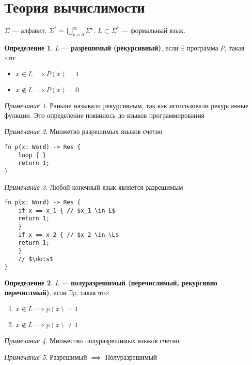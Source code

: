 \documentclass[oneside]{book}
\theoremstyle{plain}
\theoremstyle{remark}
\newtheorem*{remark}{Примечание}
\theoremstyle{definition}
\newtheorem*{definition}{Определение}
\begin{document}
\section{Теория вычислимости}
\label{sec:org5715bcb}
\(\Sigma\) --- алфавит, \(\Sigma^* = \bigcup_{k = 0}^\infty \Sigma^k\). \(L \subset \Sigma^*\) --- формальный язык.
\begin{definition}
\(L\) --- \textbf{разрешимый (рекурсивный)}, если \(\exists\) программа \(P\), такая что:
\begin{itemize}
\item \(x \in L \implies P(x) = 1\)
\item \(x \not\in L \implies P(x) = 0\)
\end{itemize}
\end{definition}
\begin{remark}
Раньше называли рекурсивным, так как использовали рекурсивные функции. Это определение появилось до языков программирования
\end{remark}
\begin{remark}
Множетво разрешимых языков счетно
\begin{verbatim}
fn p(x: Word) -> Res {
    loop { }
    return 1;
}
\end{verbatim}
\end{remark}
\begin{remark}
Любой конечный язык является разрешимым
\begin{verbatim}
fn p(x: Word) -> Res {
    if x == x_1 { // $x_1 \in L$
	return 1; 
    }
    if x == x_2 { // $x_2 \in \L$
	return 1;
    }
    // $\dots$
}
\end{verbatim}
\end{remark}
\begin{definition}
\(L\) --- \textbf{полуразрешимый (перечислимый, рекурсивно перечислмый)}, если \(\exists p\), такая что:
\begin{enumerate}
\item \(x \in L \implies p(x) = 1\)
\item \(x \not\in L \implies p(x) \neq 1\)
\end{enumerate}
\end{definition}
\begin{remark}
Множество полуразрешимых языков счетно
\end{remark}
\begin{remark}
Разрешимый \(\implies\) Полуразрешимый
\end{remark}
\end{document}
